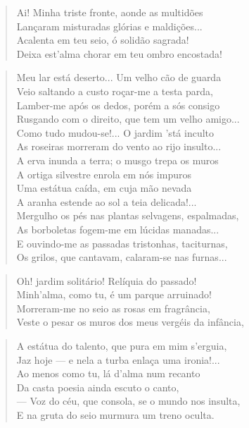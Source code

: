 \begin{anexosenv}
\begin{verse}
Ai! Minha triste fronte, aonde as multidões \\
Lançaram misturadas glórias e maldições... \\
Acalenta em teu seio, ó solidão sagrada! \\
Deixa est'alma chorar em teu ombro encostada! \\
\end{verse}

\begin{verse}
Meu lar está deserto... Um velho cão de guarda \\
Veio saltando a custo roçar-me a testa parda, \\
Lamber-me após os dedos, porém a sós consigo \\
Rusgando com o direito, que tem um velho amigo... \\
Como tudo mudou-se!... O jardim 'stá inculto \\
As roseiras morreram do vento ao rijo insulto... \\
A erva inunda a terra; o musgo trepa os muros \\
A ortiga silvestre enrola em nós impuros \\
Uma estátua caída, em cuja mão nevada \\
A aranha estende ao sol a teia delicada!... \\
Mergulho os pés nas plantas selvagens, espalmadas, \\
As borboletas fogem-me em lúcidas manadas... \\
E ouvindo-me as passadas tristonhas, taciturnas, \\
Os grilos, que cantavam, calaram-se nas furnas... \\
\end{verse}

\begin{verse}
Oh! jardim solitário! Relíquia do passado! \\
Minh'alma, como tu, é um parque arruinado! \\
Morreram-me no seio as rosas em fragrância, \\
Veste o pesar os muros dos meus vergéis da infância, \\
\end{verse}

\begin{verse}
A estátua do talento, que pura em mim s'erguia, \\
Jaz hoje — e nela a turba enlaça uma ironia!... \\
Ao menos como tu, lá d'alma num recanto \\
Da casta poesia ainda escuto o canto, \\
— Voz do céu, que consola, se o mundo nos insulta, \\
E na gruta do seio murmura um treno oculta. \\
\end{verse}


\end{anexosenv}
